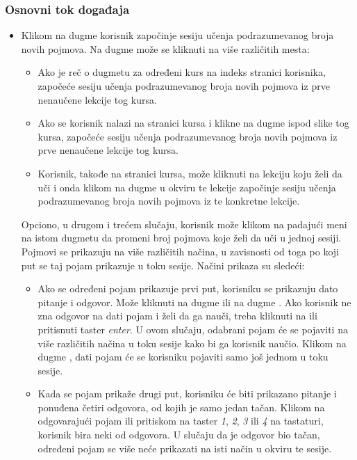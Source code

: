 \subsubsection{Osnovni tok događaja}
\begin{itemize}
  \item
  Klikom na dugme  korisnik započinje sesiju učenja podrazumevanog broja novih pojmova.
  Na dugme  može se kliknuti na više različitih mesta:
  \begin{itemize}
    \item
    Ako je reč o dugmetu za određeni kurs na indeks stranici korisnika, započeće sesiju učenja podrazumevanog broja novih pojmova iz prve nenaučene lekcije tog kursa.
    \item
    Ako se korisnik nalazi na stranici kursa i klikne na dugme  ispod slike tog kursa, započeće sesiju učenja podrazumevanog broja novih pojmova iz prve nenaučene lekcije tog kursa.
    \item
    Korisnik, takođe na stranici kursa, može kliknuti na lekciju koju želi da uči i onda klikom na dugme  u okviru te lekcije započinje sesiju učenja podrazumevanog broja novih pojmova iz te konkretne lekcije.
  \end{itemize}
  Opciono, u drugom i trećem slučaju, korisnik može klikom na padajući meni na istom dugmetu da promeni broj pojmova koje želi da uči u jednoj sesiji.
  Pojmovi se prikazuju na više različitih načina, u zavisnosti od toga po koji put se taj pojam prikazuje u toku sesije.
  Načini prikaza su sledeći:
  \begin{itemize}
    \item
    Ako se određeni pojam prikazuje prvi put, korisniku se prikazuju dato pitanje i odgovor.
    Može kliknuti na dugme  ili na dugme .
    Ako korisnik ne zna odgovor na dati pojam i želi da ga nauči, treba kliknuti na  ili pritisnuti taster \emph{enter}.
    U ovom slučaju, odabrani pojam će se pojaviti na više različitih načina u toku sesije kako bi ga korisnik naučio.
    Klikom na dugme , dati pojam će se korisniku pojaviti samo još jednom u toku sesije.
    \item
    Kada se pojam prikaže drugi put, korisniku će biti prikazano pitanje i ponuđena četiri odgovora, od kojih je samo jedan tačan.
    Klikom na odgovarajući pojam ili pritiskom na taster \emph{1}, \emph{2}, \emph{3} ili \emph{4} na tastaturi, korisnik bira neki od odgovora.
    U slučaju da je odgovor bio tačan, određeni pojam se više neće prikazati na isti način u okviru te sesije.

\end{itemize}
\end{itemize}
